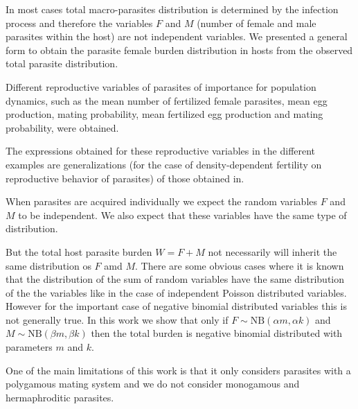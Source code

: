 \documentclass[12pt,a4paper]{article}
\theoremstyle{plain}%
\theoremstyle{definition}
\theoremstyle{remark}
\begin{document}
		
In most cases total macro-parasites distribution is determined by the infection process and therefore the variables $F$ and $M$ (number of female and male parasites within the host) are not independent variables. We presented a general form to obtain the parasite female burden distribution in hosts from the observed total parasite distribution. 	
	
Different reproductive variables of parasites of importance for population dynamics, such as the mean number of fertilized female parasites, mean egg production, mating probability, mean fertilized egg production and mating probability, were obtained. 
	
The  expressions obtained for these reproductive variables in the different examples are generalizations (for the case of density-dependent fertility on reproductive behavior of parasites) of those obtained in\citep{leyton1968stochastic,may1993biased,may1977togetherness}.



When parasites are acquired individually we expect the random variables $F$ and $M$ to be independent. We also expect that these variables have the same type of distribution. 


But the total host parasite burden $W=F+M$ not necessarily will inherit the same distribution os $F$ amd $M$. There are some obvious cases where it is known that the distribution of the sum of random variables have the same distribution of the the variables like in the case of independent Poisson distributed variables. However for the important case of negative binomial distributed variables this is not generally true. In this work we show that 
only if
$F\sim \mathrm{NB}(\alpha m,\alpha k)$ and $ M\sim \mathrm{NB}(\beta m,\beta k)$ then the total burden is negative binomial distributed with parameters $m$ and $k$. 


	
One of the main limitations of this work is that it only considers parasites with a polygamous mating system and we do not consider monogamous and hermaphroditic parasites.
\end{document}
